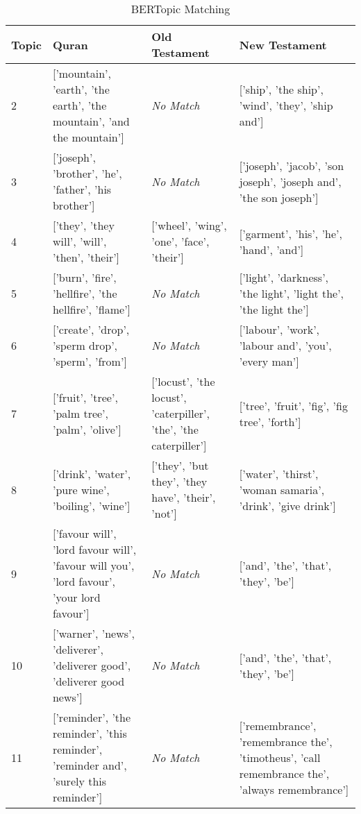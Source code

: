 \documentclass{article}
\begin{document}
    \begin{table}[H]
        \centering
        \begin{tabular}{|p{1cm}|p{4cm}|p{4cm}|p{4cm}|}
        \toprule
        Topic & Quran & Old Testament & New Testament \\
        \midrule
        2 & ['mountain', 'earth', 'the earth', 'the mountain', 'and the mountain'] & \textit{No Match} & ['ship', 'the ship', 'wind', 'they', 'ship and'] \\
        3 & ['joseph', 'brother', 'he', 'father', 'his brother'] & \textit{No Match} & ['joseph', 'jacob', 'son joseph', 'joseph and', 'the son joseph'] \\
        4 & ['they', 'they will', 'will', 'then', 'their'] & ['wheel', 'wing', 'one', 'face', 'their'] & ['garment', 'his', 'he', 'hand', 'and'] \\
        5 & ['burn', 'fire', 'hellfire', 'the hellfire', 'flame'] & \textit{No Match} & ['light', 'darkness', 'the light', 'light the', 'the light the'] \\
        6 & ['create', 'drop', 'sperm drop', 'sperm', 'from'] & \textit{No Match} & ['labour', 'work', 'labour and', 'you', 'every man'] \\
        7 & ['fruit', 'tree', 'palm tree', 'palm', 'olive'] & ['locust', 'the locust', 'caterpiller', 'the', 'the caterpiller'] & ['tree', 'fruit', 'fig', 'fig tree', 'forth'] \\
        8 & ['drink', 'water', 'pure wine', 'boiling', 'wine'] & ['they', 'but they', 'they have', 'their', 'not'] & ['water', 'thirst', 'woman samaria', 'drink', 'give drink'] \\
        9 & ['favour will', 'lord favour will', 'favour will you', 'lord favour', 'your lord favour'] & \textit{No Match} & ['and', 'the', 'that', 'they', 'be'] \\
        10 & ['warner', 'news', 'deliverer', 'deliverer good', 'deliverer good news'] & \textit{No Match} & ['and', 'the', 'that', 'they', 'be'] \\
        11 & ['reminder', 'the reminder', 'this reminder', 'reminder and', 'surely this reminder'] & \textit{No Match} & ['remembrance', 'remembrance the', 'timotheus', 'call remembrance the', 'always remembrance'] \\
        \bottomrule
        \end{tabular}
        \caption{BERTopic Matching}
        \label{tab:my_label}
    \end{table}
    
\end{document}
